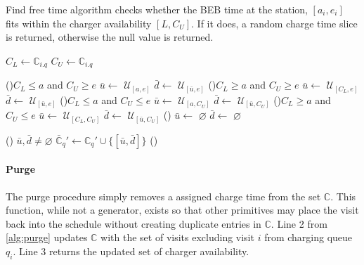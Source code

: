 \documentclass[11pt,a4paper,final]{article}
\newcommand{\C}{\mathbb{C}}                 %
\newcommand{\U}{\mathcal{U}}                %
\begin{document}
\begin{algorithm}[H]
\caption{Find free time algorithm checks whether the BEB time at the station, $[a_i, e_i]$ fits within the charger availability $[L,C_U]$. If it does, a random charge time slice is returned, otherwise the null value is returned.}
\label{alg:find-free-time}
    \LinesNumbered
    \KwIn{$(\C, i, q, a, e)$}
    \KwOut{($\bar{\C}, \bar{u}, \bar{d})$}

    \Begin
    { 
      $C_L \leftarrow \C_{i.q}$\;
      $C_U \leftarrow \C_{i.q}$\;

      \If(){$C_L \leq a$ and $C_U \geq e$}
      {
        $\bar{u}\leftarrow$ $\U_{[a,e]}$\;
        $\bar{d}\leftarrow$ $\U_{[\bar{u},e]}$\;
      }
      \ElseIf(){$C_L \ge a$ and $C_U \geq e$}
      {
        $\bar{u}\leftarrow$ $\U_{[C_L,e]}$\;
        $\bar{d}\leftarrow$ $\U_{[\bar{u},e]}$\;
      }
      \ElseIf(){$C_L \leq a$ and $C_U \le e$}
      {
        $\bar{u}\leftarrow$ $\U_{[a,C_U]}$\;
        $\bar{d}\leftarrow$ $\U_{[\bar{u},C_U]}$\;
      }
      \ElseIf(){$C_L \ge a$ and $C_U \le e$}
      {
        $\bar{u}\leftarrow$ $\U_{[C_L,C_U]}$\;
        $\bar{d}\leftarrow$ $\U_{[\bar{u},C_U]}$\;
      }
      \Else()
      {
        $\bar{u}\leftarrow$ $\varnothing$\;
        $\bar{d}\leftarrow$ $\varnothing$\;
      }

      \If () {$\bar{u},\bar{d} \ne \varnothing$}
      {
        $\bar{\C}_q' \leftarrow \C_q' \cup \{[\bar{u},\bar{d}]\}$
      }
      \Else()
      {
      }
    }
\end{algorithm}

\paragraph{Purge}
\label{sec:purge}
The purge procedure simply removes a assigned charge time from the set \(\C\). This function, while not a generator,
exists so that other primitives may place the visit back into the schedule without creating duplicate entries in \(\C\).
Line 2 from \ref{alg:purge} updates \(\C\) with the set of visits excluding visit \(i\) from charging queue \(q_i\). Line 3
returns the updated set of charger availability.
\end{document}
